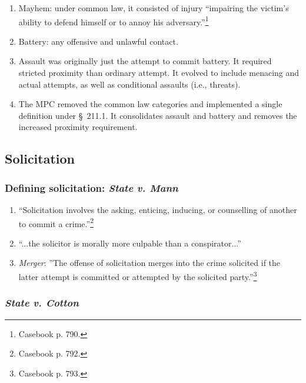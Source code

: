 \begin{enumerate}
    \item Mayhem: under common law, it consisted of injury ``impairing the 
    victim's ability to defend himself or to annoy his 
    adversary.''\footnote{Casebook p. 790.}
    \item Battery: any offensive and unlawful contact.
    \item Assault was originally just the attempt to commit battery. It 
    required stricted proximity than ordinary attempt. It evolved to include 
    menacing and actual attempts, as well as conditional assaults (i.e., 
    threats).
    \item The MPC removed the common law categories and implemented a single 
    definition under \S\ 211.1. It consolidates assault and battery and 
    removes the increased proximity requirement.
\end{enumerate}

\subsection{Solicitation}

\subsubsection{Defining solicitation: \emph{State v. Mann}}

\begin{enumerate}
    \item ``Solicitation involves the asking, enticing, inducing, or 
    counselling of another to commit a crime.''\footnote{Casebook p. 792.}
    \item ``...the solicitor is morally more culpable than a conspirator...''
    \item \emph{Merger}: ''The offense of solicitation merges into the crime 
    solicited if the latter attempt is committed or attempted by the solicited 
    party.''\footnote{Casebook p. 793.}
\end{enumerate}

\subsubsection{\emph{State v. Cotton}}

